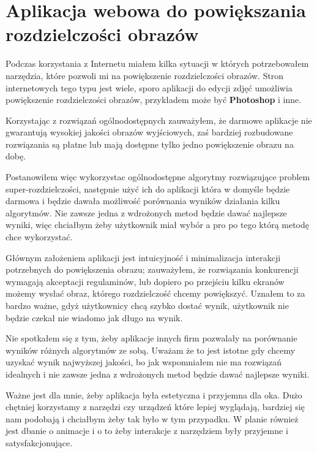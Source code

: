 \chapter{Aplikacja webowa do powiększania rozdzielczości obrazów} \label{chap:app}

Podczas korzystania z Internetu miałem kilka sytuacji w których potrzebowałem narzędzia, które pozwoli mi na powiększenie rozdzielczości obrazów. Stron internetowych tego typu jest wiele, sporo aplikacji do edycji zdjęć umożliwia powiększenie rozdzielczości obrazów, przykładem może być \textbf{Photoshop} i inne.

Korzystając z rozwiązań ogólnodostępnych zauważyłem, że darmowe aplikacje nie gwarantują wysokiej jakości obrazów wyjściowych, zaś bardziej rozbudowane rozwiązania są płatne lub mają dostępne tylko jedno powiększenie obrazu na dobę. 

Postanowiłem więc wykorzystac ogólnodostępne algorytmy rozwiązujące problem super-rozdzielczości, następnie użyć ich do aplikacji która w domyśle będzie darmowa i będzie dawała możliwość porównania wyników działania kilku algorytmów. Nie zawsze jedna z wdrożonych metod będzie dawać najlepsze wyniki, więc chciałbym żeby użytkownik miał wybór a pro po tego którą metodę chce wykorzystać.

Głównym założeniem aplikacji jest intuicyjność i minimalizacja interakcji potrzebnych do powiększenia obrazu; zauważyłem, że rozwiązania konkurencji wymagają akceptacji regulaminów, lub dopiero po przejściu kilku ekranów możemy wysłać obraz, którego rozdzielczość chcemy powiększyć. Uznałem to za bardzo ważne, gdyż użytkownicy chcą szybko dostać wynik, użytkownik nie będzie czekał nie wiadomo jak długo na wynik.

Nie spotkałem się z tym, żeby aplikacje innych firm pozwalały na porównanie wyników różnych algorytmów ze sobą. Uważam że to jest istotne gdy chcemy uzyskać wynik najwyższej jakości, bo jak wspomniałem nie ma rozwiązań idealnych i nie zawsze jedna z wdrożonych metod będzie dawać najlepsze wyniki.

Ważne jest dla mnie, żeby aplikacja była estetyczna i przyjemna dla oka. Dużo chętniej korzystamy z narzędzi czy urządzeń które lepiej wyglądają, bardziej się nam podobają i chciałbym żeby tak było w tym przypadku. W planie również jest dbanie o animacje i o to żeby interakcje z narzędziem były przyjemne i satysfakcjonujące.

